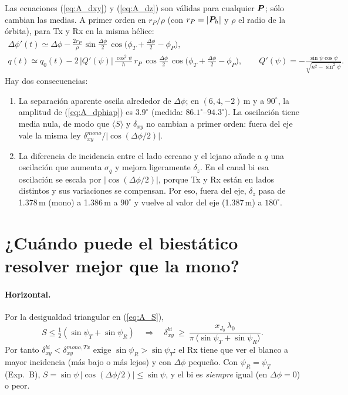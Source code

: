 Las ecuaciones (\ref{eq:A_dxy}) y (\ref{eq:A_dz}) son válidas para cualquier $\bm{P}$; sólo
cambian las medias. A primer orden en $r_P/\rho$ (con $r_P=|\bm{P}_h|$ y $\rho$ el radio de
la órbita), para Tx y Rx en la misma hélice:
\begin{gather}
  \Delta\phi'(t)\simeq\Delta\phi-\frac{2r_P}{\rho}\,\sin\frac{\Delta\phi}{2}\,
  \cos\!\Big(\phi_T+\frac{\Delta\phi}{2}-\phi_P\Big),\label{eq:A_dphiap}\\
  q(t)\simeq q_0(t)-2\,\big|Q'(\psi)\big|\,\frac{\cos^2\psi}{h}\,r_P\,
  \cos\frac{\Delta\phi}{2}\,\cos\!\Big(\phi_T+\frac{\Delta\phi}{2}-\phi_P\Big),
  \qquad Q'(\psi)=-\frac{\sin\psi\cos\psi}{\sqrt{n^2-\sin^2\psi}} .\label{eq:A_qap}
\end{gather}
Hay dos consecuencias:
\begin{enumerate}[itemsep=1pt]
  \item La separación aparente oscila alrededor de $\Delta\phi$; en $(6,4,-2)$\,m y a $90^{\circ}$,
  la amplitud de (\ref{eq:A_dphiap}) es $3.9^{\circ}$ (medida: $86.1^{\circ}$--$94.3^{\circ}$). La
  oscilación tiene media nula, de modo que $\langle S\rangle$ y $\delta_{xy}$ no cambian a
  primer orden: fuera del eje vale la misma ley $\delta_{xy}^{mono}/|\cos(\Delta\phi/2)|$.
  \item La diferencia de incidencia entre el lado cercano y el lejano añade a $q$ una
  oscilación que aumenta $\sigma_q$ y mejora ligeramente $\delta_z$. En el canal bi esa
  oscilación se escala por $|\cos(\Delta\phi/2)|$, porque Tx y Rx están en lados distintos y
  sus variaciones se compensan. Por eso, fuera del eje, $\delta_z$ pasa de 1.378\,m (mono)
  a 1.386\,m a $90^{\circ}$ y vuelve al valor del eje (1.387\,m) a $180^{\circ}$.
\end{enumerate}

\section{¿Cuándo puede el biestático resolver mejor que la mono?}

\paragraph{Horizontal.} Por la desigualdad triangular en (\ref{eq:A_S}),
\begin{equation}
  S\le\tfrac12(\sin\psi_T+\sin\psi_R)
  \quad\Longrightarrow\quad
  \delta_{xy}^{bi}\ \ge\ \frac{x_{J_0}\,\lambda_0}{\pi\,\langle\sin\psi_T+\sin\psi_R\rangle} .
\end{equation}
Por tanto $\delta_{xy}^{bi}<\delta_{xy}^{mono,Tx}$ exige $\sin\psi_R>\sin\psi_T$: el Rx tiene
que ver el blanco a mayor incidencia (más bajo o más lejos) y con $\Delta\phi$ pequeño. Con
$\psi_R=\psi_T$ (Exp.~B), $S=\sin\psi\,|\cos(\Delta\phi/2)|\le\sin\psi$, y el bi es
\emph{siempre} igual (en $\Delta\phi=0$) o peor.

